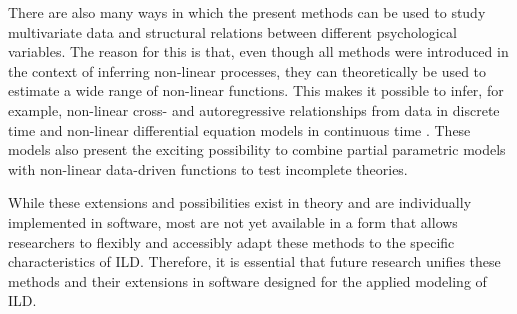 \documentclass[man, floatsintext]{apa7}
\begin{document}
There are also many ways in which the present methods can be used to study
multivariate data and structural relations between different psychological
variables. The reason for this is that, even though all methods were introduced
in the context of inferring non-linear processes, they can theoretically be
used to estimate a wide range of non-linear functions. This makes it possible
to infer, for example, non-linear cross- and autoregressive relationships from
data in discrete time \parencite{bringmann_modeling_2015,
  wood_generalized_2006, rasmussen_gaussian_2006,
  eleftheriadis_identification_2017} and non-linear differential equation
models
in continuous time \parencite{yildiz_learning_2018}. These models also present
the exciting possibility to combine partial parametric models with non-linear
data-driven functions to test incomplete theories.

While these extensions and possibilities exist in theory and are individually
implemented in software, most are not yet available in a form that allows
researchers to flexibly and accessibly adapt these methods to the specific
characteristics of ILD\@. Therefore, it is essential that future research
unifies these methods and their extensions in software designed for the applied
modeling of ILD\@.

\printbibliography[]
\end{document}
